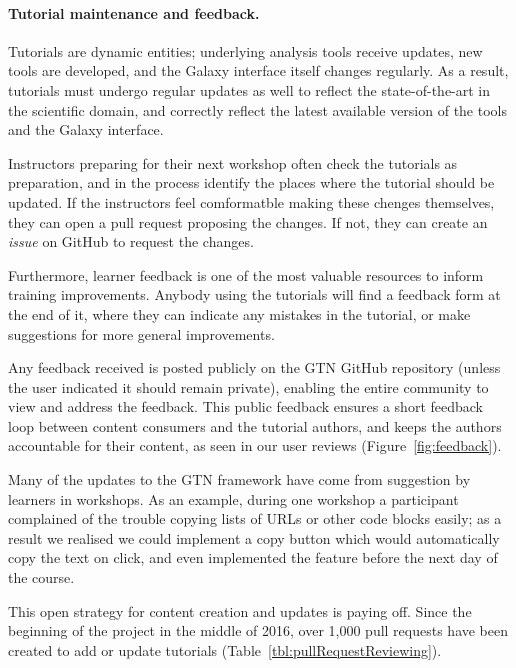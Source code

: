 \documentclass[10pt,letterpaper]{article}
\begin{document}
\paragraph*{Tutorial maintenance and feedback.} Tutorials are dynamic entities; underlying analysis tools receive updates, new tools are developed, and the Galaxy interface itself changes regularly.
As a result, tutorials must undergo regular updates as well to reflect the state-of-the-art in the scientific domain, and correctly reflect the latest available version of the tools and the Galaxy interface.

Instructors preparing for their next workshop often check the tutorials as preparation, and in the process identify the places where the tutorial should be updated.
If the instructors feel comformatble making these chenges themselves, they can open a pull request proposing the changes.
If not, they can create an \emph{issue} on GitHub to request the changes.

Furthermore, learner feedback is one of the most valuable resources to inform training improvements.
Anybody using the tutorials will find a feedback form at the end of it, where they can indicate any mistakes in the tutorial, or make suggestions for more general improvements.

Any feedback received is posted publicly on the GTN GitHub repository (unless the user indicated it should remain private), enabling the entire community to view and address the feedback.
This public feedback ensures a short feedback loop between content consumers and the tutorial authors, and keeps the authors accountable for their content, as seen in our user reviews (Figure~\ref{fig:feedback}).


Many of the updates to the GTN framework have come from suggestion by learners in workshops.
As an example, during one workshop a participant complained of the trouble copying lists of URLs or other code blocks easily; as a result we realised we could implement a copy button which would automatically copy the text on click, and even implemented the feature before the next day of the course.


This open strategy for content creation and updates is paying off.
Since the beginning of the project in the middle of 2016, over 1,000 pull requests have been created to add or update tutorials (Table~\ref{tbl:pullRequestReviewing}).
\end{document}
